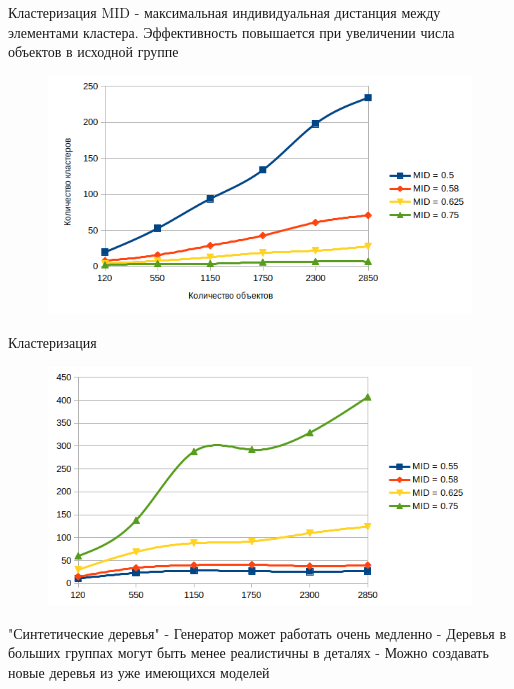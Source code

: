 \documentclass[14pt]{beamer}
\begin{document}
\begin{frame}{Кластеризация}
MID - максимальная индивидуальная дистанция между элементами
кластера.
Эффективность повышается при увеличении числа объектов в исходной группе
\begin{figure}[hbtp]
\includegraphics[scale=0.58]{stat2.png}
\end{figure}
\end{frame}
\begin{frame}{Кластеризация}
\begin{figure}[hbtp]
\includegraphics[scale=0.6]{stat3.png}
\end{figure}
\end{frame}

\begin{frame}{"Синтетические деревья"}
 - Генератор может работать очень медленно\linebreak	
 - Деревья в больших группах могут быть менее реалистичны в деталях \linebreak	
 - Можно создавать новые деревья из уже имеющихся моделей

\end{frame}
\end{document}
